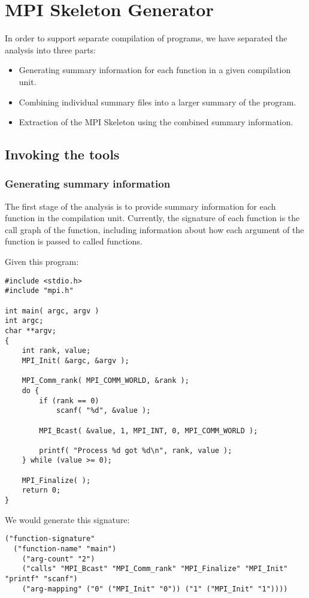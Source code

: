 \section{MPI Skeleton Generator}

In order to support separate compilation of programs, we have separated the
analysis into three parts:

\begin{itemize}
\item Generating summary information for each function in a given compilation unit.
\item Combining individual summary files into a larger summary of the program.
\item Extraction of the MPI Skeleton using the combined summary information.
\end{itemize}

\subsection{Invoking the tools}

\subsubsection{Generating summary information}

The first stage of the analysis is to provide summary information for each
function in the compilation unit. Currently, the signature of each function is
the call graph of the function, including information about how each argument
of the function is passed to called functions.

Given this program:
\begin{verbatim}
#include <stdio.h>
#include "mpi.h"

int main( argc, argv )
int argc;
char **argv;
{
    int rank, value;
    MPI_Init( &argc, &argv );

    MPI_Comm_rank( MPI_COMM_WORLD, &rank );
    do {
        if (rank == 0)
            scanf( "%d", &value );

        MPI_Bcast( &value, 1, MPI_INT, 0, MPI_COMM_WORLD );

        printf( "Process %d got %d\n", rank, value );
    } while (value >= 0);

    MPI_Finalize( );
    return 0;
}
\end{verbatim}

We would generate this signature:
\begin{verbatim}
("function-signature"
  ("function-name" "main")
    ("arg-count" "2")
    ("calls" "MPI_Bcast" "MPI_Comm_rank" "MPI_Finalize" "MPI_Init" "printf" "scanf")
    ("arg-mapping" ("0" ("MPI_Init" "0")) ("1" ("MPI_Init" "1"))))
\end{verbatim}

